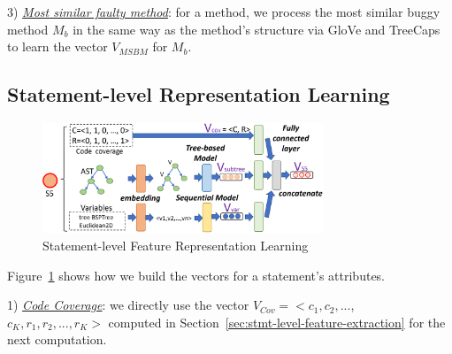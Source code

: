 
3) {\em \underline{Most similar faulty method}}: for a method, we
process the most similar buggy method $M_b$ 
in the same way as the method's structure via GloVe and TreeCaps to
learn the vector $V_{MSBM}$ for $M_b$.


\subsection{Statement-level Representation Learning}

\begin{figure}[t]
	\centering
	\includegraphics[width=3.3in]{graphs/step-2-statement-new-2.png}
        \vspace{-9pt}
	\caption{Statement-level Feature Representation Learning}
	\label{statement-level-feature-learning}
\end{figure}

Figure~\ref{statement-level-feature-learning} shows how we build the
vectors for a statement's attributes.

1) {\em \underline{Code Coverage}}: we directly use the vector
$V_{Cov} = <c_1, c_2, ...$, $c_K, r_1, r_2, ..., r_K>$ computed in
Section~\ref{sec:stmt-level-feature-extraction} for the next
computation.

